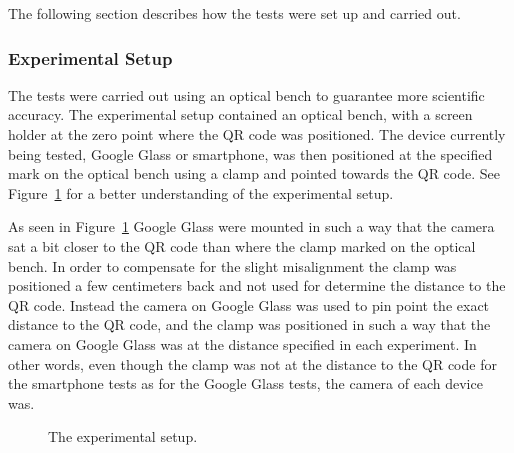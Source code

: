 The following section describes how the tests were set up and carried out.

\subsubsection{Experimental Setup}
The tests were carried out using an optical bench to guarantee more scientific accuracy. The experimental setup contained an optical bench, with a screen holder at the zero point where the QR code was positioned. The device currently being tested, Google Glass or smartphone, was then positioned at the specified mark on the optical bench using a clamp and pointed towards the QR code. See Figure~\ref{experimentalSetup} for a better understanding of the experimental setup. 

As seen in Figure~\ref{experimentalSetup} Google Glass were mounted in such a way that the camera sat a bit closer to the QR code than where the clamp marked on the optical bench. In order to compensate for the slight misalignment the clamp was positioned a few centimeters back and not used for determine the distance to the QR code. Instead the camera on Google Glass was used to pin point the exact distance to the QR code, and the clamp was positioned in such a way that the camera on Google Glass was at the distance specified in each experiment. In other words, even though the clamp was not at the distance to the QR code for the smartphone tests as for the Google Glass tests, the camera of each device was.

	\begin{figure}[H]%
		\centering
   		 \qquad
   		 \qquad
		\caption{The experimental setup.}
		\label{experimentalSetup}
	\end{figure}

